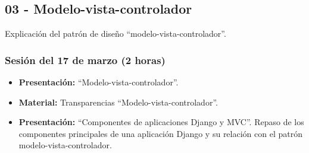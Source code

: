 \documentclass[a4paper,12pt]{article}
\begin{document}


\subsection{03 - Modelo-vista-controlador}

Explicación del patrón de diseño ``modelo-vista-controlador''.

\subsubsection{Sesión del 17 de marzo (2 horas)}

\begin{itemize}
\item \textbf{Presentación:} ``Modelo-vista-controlador''.
\item \textbf{Material:} Transparencias ``Modelo-vista-controlador''.
\item \textbf{Presentación:} ``Componentes de aplicaciones Django y MVC''.
 Repaso de los componentes principales de una aplicación Django y su relación con el patrón modelo-vista-controlador.
\end{itemize}

\end{document}
